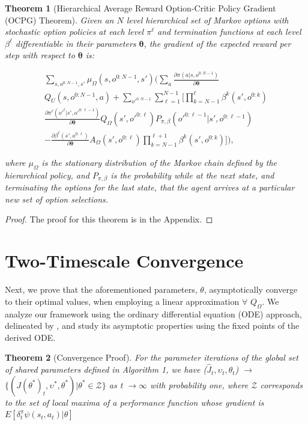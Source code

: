 \documentclass[letterpaper]{article} %
\newtheorem{theorem}{Theorem}
\newcommand{\citet}[1]{\citeauthor{#1} \shortcite{#1}}
\begin{document}
\begin{theorem}[Hierarchical Average Reward Option-Critic Policy Gradient (OCPG) Theorem]
\label{HARPG}
Given an $N$ level hierarchical set of  Markov  options  with  stochastic  option  policies at each level $\pi^\ell$ and termination functions at each level $\beta^\ell$ differentiable in their parameters $\bm{\theta}$, the gradient of the expected reward per step with respect to $\bm{\theta}$ is:

\begin{footnotesize}
\begin{align*}
\sum_{s,o^{0:N-1},s'}\!\!\!\!\mu_\Omega(s,o^{0:N-1},s')
\bigg(\sum_{a} \frac{\partial \pi(a|s,o^{0:N-1})}{\partial \bm{\theta}} \\
Q_U(s,o^{0:N-1},a) +  \sum_{o'^{0:N-1}} \sum_{\ell=1}^{N-1} \bigg[ \!\prod_{k=N-1}^{\ell}\!\!\!\!\beta^k(s',o^{0:k}) \\ \frac{\partial \pi^\ell(o'^\ell|s',o'^{0:\ell-1})}{\partial \bm{\theta}} Q_\Omega(s',o'^{0:\ell}) P_{\pi,\beta}(o'^{0:\ell-1}|s',o^{0:\ell-1}) \\
- \frac{\partial \beta^\ell(s',o^{0:\ell})}{\partial \bm{\theta}} A_\Omega(s',o^{0:\ell})\!\!\!\!\prod_{k=N-1}^{\ell+1}\!\!\!\!\beta^k(s',o^{0:k}) \bigg] \bigg),
\end{align*}
\end{footnotesize}
where $\mu_\Omega$ is the stationary distribution of the Markov chain defined by the hierarchical policy, and $P_{\pi,\beta}$ is the probability while at the next state, and terminating the options for the last state, that the agent arrives at a particular new set of option selections.
\end{theorem}

\begin{proof}
The proof for this theorem is in the Appendix.
\end{proof}

\section{Two-Timescale Convergence}
Next, we prove that the aforementioned parameters, $\theta$, asymptotically converge to their optimal values, when employing a linear approximation $\forall$ $Q_\Omega$.
We analyze our framework using the ordinary differential equation (ODE) approach, delineated by \citet{bhatnagar2009natural}, and study its asymptotic properties using the fixed points of the derived ODE.


\begin{theorem}[Convergence Proof]
\label{conv}
For the parameter iterations of the global set of shared parameters defined in Algorithm 1, we have ($\hat{J}_{t}, \upsilon_{t}, \theta_{t} $) $\to$ $\{(J(\theta^{*})_{t}, \upsilon^{*}, \theta^{*} )|\theta^{*} \in \mathcal{Z}\}$ as t $\to \infty$ with probability one, where $\mathcal{Z}$ corresponds to the set of local maxima of a performance function whose gradient is $E[\delta^{\pi}_{t}\psi(s_{t},a_{t})|\theta]$
\end{theorem}
\end{document}
